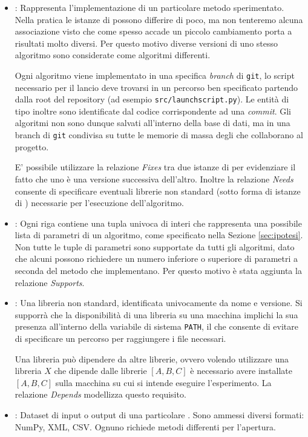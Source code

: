 \documentclass{article}
\begin{document}
\begin{itemize}
    \item {}: Rappresenta l'implementazione di un particolare metodo sperimentato. Nella pratica le istanze di  possono differire di poco, ma non tenteremo alcuna associazione visto che come spesso accade un piccolo cambiamento porta a risultati molto diversi. Per questo motivo diverse versioni di uno stesso algoritmo sono considerate come algoritmi differenti.

    Ogni algoritmo viene implementato in una specifica \emph{branch} di \texttt{git}, lo script necessario per il lancio deve trovarsi in un percorso ben specificato partendo dalla root del repository (ad esempio \texttt{src/launchscript.py}). Le entità di tipo  inoltre sono identificate dal codice corrispondente ad una \emph{commit}. Gli algoritmi non sono dunque salvati all'interno della base di dati, ma in una branch di \texttt{git} condivisa su tutte le memorie di massa degli  che collaborano al progetto.

    E' possibile utilizzare la relazione \emph{Fixes} tra due istanze di  per evidenziare il fatto che uno è una versione successiva dell'altro. Inoltre la relazione \emph{Needs} consente di specificare eventuali librerie non standard (sotto forma di istanze di ) necessarie per l'esecuzione dell'algoritmo.
    \item {}: Ogni riga contiene una tupla univoca di interi che rappresenta una possibile lista di parametri di un algoritmo, come specificato nella Sezione \ref{sec:ipotesi}. Non tutte le tuple di parametri sono supportate da tutti gli algoritmi, dato che alcuni possono richiedere un numero inferiore o superiore di parametri a seconda del metodo che implementano. Per questo motivo è stata aggiunta la relazione \emph{Supports}.
    \item {}: Una libreria non standard, identificata univocamente da nome e versione. Si supporrà che la disponibilità di una libreria su una macchina implichi la sua presenza all'interno della variabile di sistema \texttt{PATH}, il che consente di evitare di specificare un percorso per raggiungere i file necessari.

    Una libreria può dipendere da altre librerie, ovvero volendo utilizzare una libreria $X$ che dipende dalle librerie $[A,B,C]$ è necessario avere installate $[A,B,C]$ sulla macchina su cui si intende eseguire l'esperimento. La relazione \emph{Depends} modellizza questo requisito.
    \item {}: Dataset di input o output di una particolare . Sono ammessi diversi formati: NumPy, XML, CSV. Ognuno richiede metodi differenti per l'apertura.


\end{itemize}
\end{document}
